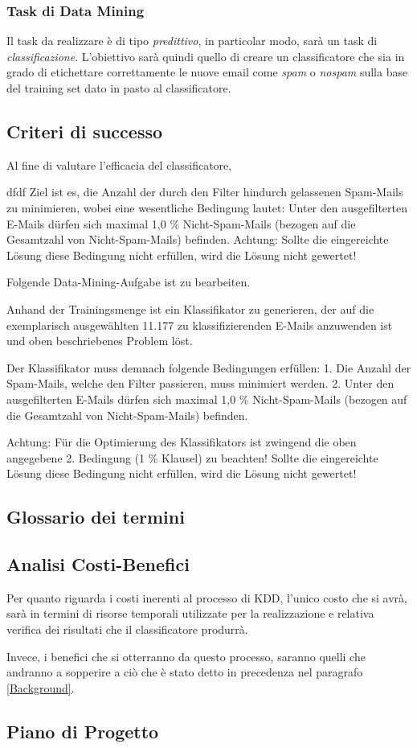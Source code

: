 \subsubsection{Task di Data Mining}
	Il task da realizzare è di tipo \textit{predittivo}, in particolar modo, sarà un task di \textit{classificazione}. L'obiettivo sarà quindi quello di creare un classificatore che sia in grado di etichettare correttamente le nuove email come \textit{spam} o \textit{nospam} sulla base del training set dato in pasto al classificatore. 
\subsection{Criteri di successo}
	Al fine di valutare l'efficacia del classificatore, 
	
	dfdf
	Ziel ist es, die Anzahl der durch den Filter hindurch gelassenen Spam-Mails zu minimieren, wobei eine wesentliche Bedingung lautet:
	Unter den ausgefilterten E-Mails dürfen sich maximal 1,0 \% Nicht-Spam-Mails (bezogen auf die Gesamtzahl von Nicht-Spam-Mails) befinden. Achtung: Sollte die eingereichte Lösung diese Bedingung nicht erfüllen, wird die Lösung nicht gewertet!
	
	Folgende Data-Mining-Aufgabe ist zu bearbeiten.
	
	Anhand der Trainingsmenge ist ein Klassifikator zu generieren,
	der auf die exemplarisch ausgewählten 11.177 zu klassifizierenden
	E-Mails anzuwenden ist und oben beschriebenes Problem löst.
	
	Der Klassifikator muss demnach folgende
	Bedingungen erfüllen:
	1. Die Anzahl der Spam-Mails, welche den Filter passieren,
	muss minimiert werden.
	2. Unter den ausgefilterten E-Mails dürfen sich maximal 1,0 \%
	Nicht-Spam-Mails (bezogen auf die Gesamtzahl von Nicht-Spam-Mails)
	befinden.
	
	Achtung: Für die Optimierung des Klassifikators ist zwingend
	die oben angegebene 2. Bedingung (1 \% Klausel) zu
	beachten! Sollte die eingereichte Lösung diese Bedingung
	nicht erfüllen, wird die Lösung nicht gewertet!

\subsection{Glossario dei termini}

\subsection{Analisi Costi-Benefici}

Per quanto riguarda i costi inerenti al processo di KDD, l'unico costo che si avrà, sarà in termini di risorse temporali utilizzate per la realizzazione e relativa verifica dei risultati che il classificatore produrrà.

Invece, i benefici che si otterranno da questo processo, saranno quelli che andranno a sopperire a ciò che è stato detto in precedenza nel paragrafo \ref{Background}.


\subsection{Piano di Progetto}